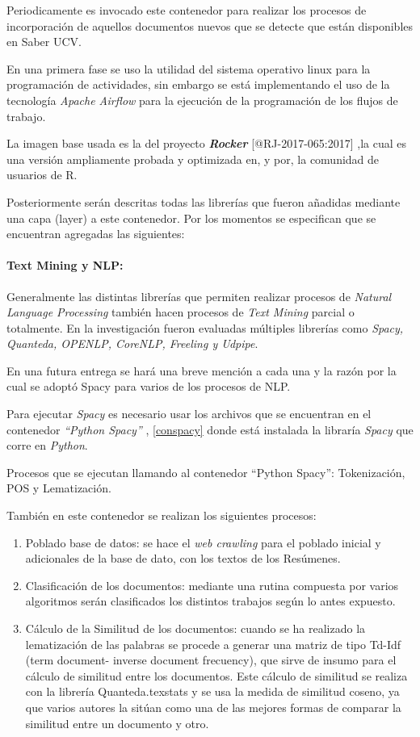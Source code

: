 \documentclass[
  10,
  openany]{book}
\begin{document}
Periodicamente es invocado este contenedor para realizar los procesos de incorporación de aquellos documentos nuevos que se detecte que están disponibles en Saber UCV.

En una primera fase se uso la utilidad del sistema operativo linux para la programación de actividades, sin embargo se está implementando el uso de la tecnología \emph{Apache Airflow} para la ejecución de la programación de los flujos de trabajo.

La imagen base usada es la del proyecto \textbf{\emph{Rocker}} {[}@RJ-2017-065:2017{]} ,la cual es una versión ampliamente probada y optimizada en, y por, la comunidad de usuarios de R.

Posteriormente serán descritas todas las librerías que fueron añadidas mediante una capa (layer) a este contenedor. Por los momentos se especifican que se encuentran agregadas las siguientes:

\hypertarget{text-mining-y-nlp}{%
\paragraph{Text Mining y NLP:}\label{text-mining-y-nlp}}

Generalmente las distintas librerías que permiten realizar procesos de \emph{Natural Language Processing} también hacen procesos de \emph{Text Mining} parcial o totalmente. En la investigación fueron evaluadas múltiples librerías como \emph{Spacy, Quanteda, OPENLP, CoreNLP, Freeling y Udpipe}.

En una futura entrega se hará una breve mención a cada una y la razón por la cual se adoptó Spacy para varios de los procesos de NLP.

Para ejecutar \emph{Spacy} es necesario usar los archivos que se encuentran en el contenedor \emph{``Python Spacy''} , \ref{conspacy} donde está instalada la libraría \emph{Spacy} que corre en \emph{Python}.

Procesos que se ejecutan llamando al contenedor ``Python Spacy'': Tokenización, POS y Lematización.

También en este contenedor se realizan los siguientes procesos:

\begin{enumerate}
\def\labelenumi{\arabic{enumi}.}
\item
  Poblado base de datos: se hace el \emph{web crawling} para el poblado inicial y adicionales de la base de dato, con los textos de los Resúmenes.
\item
  Clasificación de los documentos: mediante una rutina compuesta por varios algoritmos serán clasificados los distintos trabajos según lo antes expuesto.
\item
  Cálculo de la Similitud de los documentos: cuando se ha realizado la lematización de las palabras se procede a generar una matriz de tipo Td-Idf (term document- inverse document frecuency), que sirve de insumo para el cálculo de similitud entre los documentos. Este cálculo de similitud se realiza con la librería Quanteda.texstats y se usa la medida de similitud coseno, ya que varios autores la sitúan como una de las mejores formas de comparar la similitud entre un documento y otro.
\end{enumerate}
\end{document}
